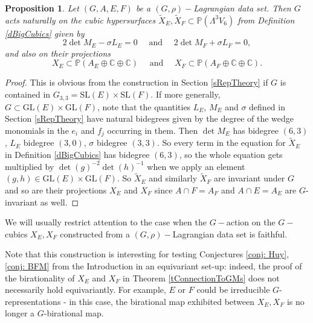 \documentclass[11pt]{amsart}
\theoremstyle{plain}
\newtheorem{proposition}[theorem]{Proposition}
\numberwithin{equation}{section}
\theoremstyle{definition}
\theoremstyle{remark}
\newcommand{\C}{\mathbb C}
\renewcommand{\P}{\mathbb P}
\newcommand{\quadand}{\quad \text{ and } \quad}
\begin{document}
\begin{proposition}\label{pGCubics}
Let $(G, A, E, F)$ be a $(G, \rho)-$Lagrangian data set. Then $G$ acts naturally on the cubic hypersurfaces $\widetilde{X}_E,\widetilde{X}_F \subset \P(\Lambda^3 V_6)$ from Definition \ref{dBigCubics} given by
\[
    2\det M_E - \sigma L_E = 0 
    \quadand
    2\det M_F  + \sigma  L_F = 0,
\]
and also on their projections \[
        X_E \subset \P(A_E\oplus \C \oplus \C) 
        \quadand
    X_F \subset \P(A_F\oplus \C \oplus \C) .
    \]
    \end{proposition}
\begin{proof}
This is obvious from the construction in Section \ref{sRepTheory} if $G$ is contained in $G_{3,3}=\mathrm{SL}(E) \times \mathrm{SL}(F)$. If more generally, $G\subset \mathrm{GL}(E) \times \mathrm{GL}(F)$, note that the quantities $L_E$, $M_E$ and $\sigma$ defined in Section \ref{sRepTheory} have natural bidegrees given by the degree of the wedge monomials in the $e_i$ and $f_j$ occurring in them. Then $\det M_E$ has bidegree $(6,3)$, $L_E$ bidegree $(3,0)$, $\sigma$ bidegree $(3,3)$. So every term in the equation for $\widetilde{X}_E$ in Definition \ref{dBigCubics} has bidegree $(6,3)$, so the whole equation gets multiplied by $\det(g)^{-2} \det(h)^{-1}$ when we apply an element $(g, h)\in \mathrm{GL}(E) \times \mathrm{GL}(F)$. So $\widetilde{X}_E$ and similarly $\widetilde{X}_F$ are invariant under $G$ and so are their projections $X_E$ and $X_F$ since $A\cap F=A_F$ and $A\cap E =A_E$ are $G$-invariant as well. 
\end{proof}

We will usually restrict attention to the case when the $G-$action on the $G-$cubics $X_E, X_F$ constructed from a $(G, \rho)-$Lagrangian data set is faithful. 

Note that this construction is interesting for testing Conjectures \ref{conj: Huy}, \ref{conj: BFM} from the Introduction in an equivariant set-up: indeed, the proof of the birationality of $X_E$ and $X_F$ in Theorem \ref{tConnectionToGMs} does not necessarily hold equivariantly.  For example, $E$ or $F$ could be irreducible $G$-representations - in this case, the birational map exhibited between $X_E, X_F$ is no longer a $G$-birational map. 
\end{document}
